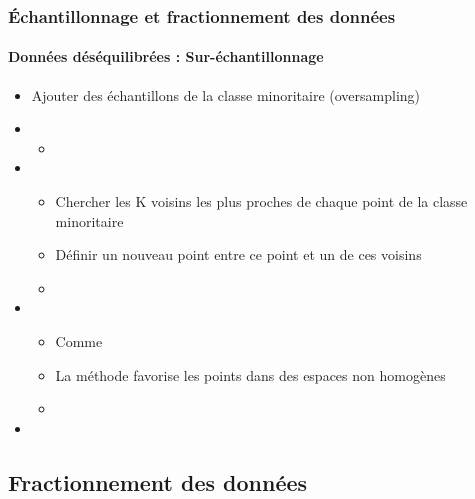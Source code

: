 \documentclass[xcolor=table]{beamer}
\begin{document}
\begin{frame}
	\frametitle{Échantillonnage et fractionnement des données}
	\framesubtitle{Données déséquilibrées : Sur-échantillonnage}
	
	\begin{itemize}
		\item Ajouter des échantillons de la classe minoritaire (oversampling)
		\item {}
		\begin{itemize}
			\item {}
		\end{itemize}
		\item {}
		\begin{itemize}
			\item Chercher les K voisins les plus proches de chaque point de la classe minoritaire
			\item Définir un nouveau point entre ce point et un de ces voisins
			\item {}
		\end{itemize}
		\item {}
		\begin{itemize}
			\item Comme 
			\item La méthode favorise les points dans des espaces non homogènes
			\item {}
		\end{itemize}
		\item {}
	\end{itemize}
	
\end{frame}

\subsection{Fractionnement des données}
\end{document}

